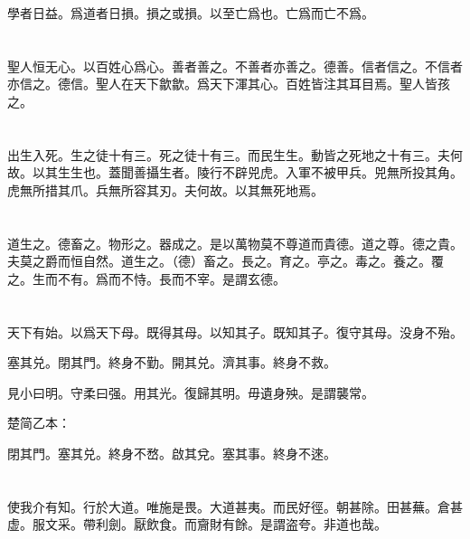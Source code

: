 \documentclass[a5paper]{ctexbook}
\begin{document}
    學者日益。爲道者日損。損之或損。以至亡爲也。亡爲而亡不爲。

    \chapter{}

    聖人恒无心。以百姓心爲心。善者善之。不善者亦善之。德善。信者信之。不信者亦信之。德信。聖人在天下歙歙。爲天下渾其心。百姓皆注其耳目焉。聖人皆孩之。

    \chapter{}

    出生入死。生之徒十有三。死之徒十有三。而民生生。動皆之死地之十有三。夫何故。以其生生也。蓋聞善攝生者。陵行不辟兕虎。入軍不被甲兵。兕無所投其角。虎無所措其爪。兵無所容其刃。夫何故。以其無死地焉。

    \chapter{}

    道生之。德畜之。物形之。器成之。是以萬物莫不尊道而貴德。道之尊。德之貴。夫莫之爵而恒自然。道生之。（德）畜之。長之。育之。亭之。毒之。養之。覆之。生而不有。爲而不恃。長而不宰。是謂玄德。

    \chapter{}

    天下有始。以爲天下母。既得其母。以知其子。既知其子。復守其母。没身不殆。
    
    塞其兑。閉其門。終身不勤。開其兑。濟其事。終身不救。
    
    見小曰明。守柔曰强。用其光。復歸其明。毋遺身殃。是謂襲常。

    楚简乙本：

    閉其門。塞其兑。終身不嵍。啟其兌。塞其事。終身不逨。

    \chapter{}

    使我介有知。行於大道。唯施是畏。大道甚夷。而民好徑。朝甚除。田甚蕪。倉甚虚。服文采。帶利劍。厭飲食。而齎財有餘。是謂盗夸。非道也哉。

    \chapter{}
\end{document}
